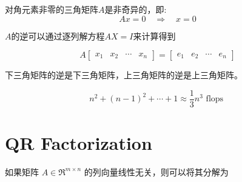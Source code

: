 \begin{theorem}
    对角元素非零的三角矩阵$A$是非奇异的，即:
\begin{equation}
A x=0 \quad \Rightarrow \quad x=0
\end{equation}
\end{theorem}

\begin{theorem}[高斯消元法]
    $A$的逆可以通过逐列解方程$AX=I$来计算得到

    \begin{equation} A\left[\begin{array}{llll}x_{1} & x_{2} & \cdots & x_{n}\end{array}\right]=\left[\begin{array}{llll}e_{1} & e_{2} & \cdots & e_{n}\end{array}\right] \end{equation}
\end{theorem}

\begin{theorem}
    下三角矩阵的逆是下三角矩阵，上三角矩阵的逆是上三角矩阵。
\end{theorem}

\begin{theorem}
    \label{complexity:inverse-of-triangular}

\begin{equation} n^{2}+(n-1)^{2}+\cdots+1 \approx \frac{1}{3} n^{3}\text{ flops }\end{equation} 
\end{theorem}



\section{QR Factorization}



如果矩阵 $ A \in \mathfrak{R}^{m \times n} $ 的列向量线性无关，则可以将其分解为

